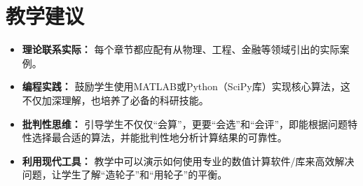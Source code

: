 \documentclass[12pt, a4paper]{article} %
\begin{document}
	\section*{教学建议}
	\begin{itemize}
		\item \textbf{理论联系实际：} 每个章节都应配有从物理、工程、金融等领域引出的实际案例。
		\item \textbf{编程实践：} 鼓励学生使用MATLAB或Python（SciPy库）实现核心算法，这不仅加深理解，也培养了必备的科研技能。
		\item \textbf{批判性思维：} 引导学生不仅仅“会算”，更要“会选”和“会评”，即能根据问题特性选择最合适的算法，并能批判性地分析计算结果的可靠性。
		\item \textbf{利用现代工具：} 教学中可以演示如何使用专业的数值计算软件/库来高效解决问题，让学生了解“造轮子”和“用轮子”的平衡。
	\end{itemize}
	
\end{document}
